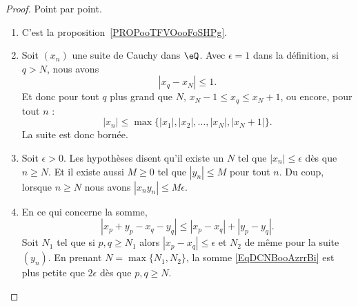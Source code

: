\begin{proof}
	Point par point.
	\begin{enumerate}
		\item
		      C'est la proposition~\ref{PROPooTFVOooFoSHPg}.
		\item
		      Soit \( (x_n)\) une suite de Cauchy dans \( \eQ\). Avec \( \epsilon=1\) dans la définition, si \( q>N\), nous avons
		      \begin{equation}
			      | x_q-x_{N} |\leq 1.
		      \end{equation}
		      Et donc pour tout \( q\) plus grand que \( N\), \( x_N-1\leq x_q\leq x_N+1\), ou encore, pour tout \( n\) :
		      \begin{equation}
			      | x_n |\leq\max\{ | x_1 |,| x_2 |,\ldots,| x_N |,| x_N+1 | \}.
		      \end{equation}
		      La suite est donc bornée.
		\item
		      Soit \(\epsilon>0\). Les hypothèses disent qu'il existe un \( N\) tel que \( | x_n |\leq \epsilon\) dès que \( n\geq N\). Et il existe aussi \( M\geq 0\) tel que \( | y_n |\leq M\) pour tout \( n\). Du coup, lorsque \( n\geq N\) nous avons \( | x_ny_n |\leq M\epsilon\).
		\item
		      En ce qui concerne la somme,
		      \begin{equation}        \label{EqDCNBooAzrrBi}
			      | x_p+y_p-x_q-y_q |\leq | x_p-x_q |+| y_p-y_q |.
		      \end{equation}
		      Soit \( N_1\) tel que si \( p,q\geq N_1\) alors \( | x_p-x_q |\leq \epsilon\) et \( N_2\) de même pour la suite \( (y_n)\). En prenant \( N=\max\{ N_1,N_2 \}\), la somme \eqref{EqDCNBooAzrrBi} est plus petite que \( 2\epsilon\) dès que \( p,q\geq N\).


\end{enumerate}
\end{proof}

